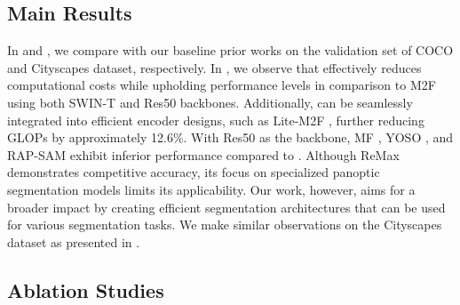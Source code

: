 \subsection{Main Results}

In  and , we compare {\ours} with our baseline prior works on the validation set of COCO and Cityscapes dataset, respectively. In , we observe that {\ours} effectively reduces computational costs while upholding performance levels in comparison to M2F \cite{cheng2021mask2former} using both SWIN-T \cite{liu2021swin} and Res50 \cite{he2016deep} backbones. Additionally, {\ours} can be seamlessly integrated into efficient encoder designs, such as Lite-M2F \cite{cheng2021mask2former}\cite{li2023lite}, further reducing GLOPs by approximately 12.6\%. With Res50 as the backbone, MF \cite{cheng2021per}, YOSO \cite{hu2023you}, and RAP-SAM \cite{xu2024rap} exhibit inferior performance compared to {\ours}. Although ReMax \cite{sun2023remax} demonstrates competitive accuracy, its focus on specialized panoptic segmentation models limits its applicability. Our work, however, aims for a broader impact by creating efficient segmentation architectures that can be used for various segmentation tasks. We make similar observations on the Cityscapes dataset as presented in . 

\subsection{Ablation Studies}
%
